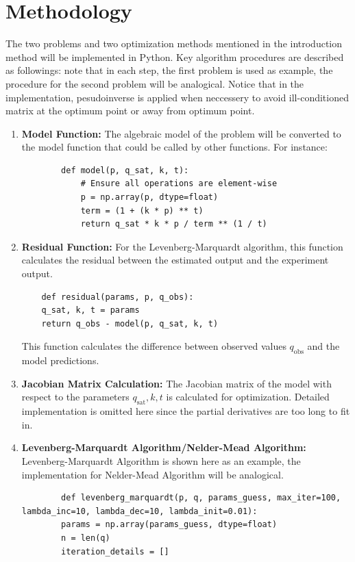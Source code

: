 \documentclass[12pt]{article} %
\begin{document}
\section{Methodology}
The two problems and two optimization methods mentioned in the introduction method will be implemented in Python. Key algorithm procedures are described as followings: note that in each step, the
first problem is used as example, the procedure for the second problem will be analogical. Notice that in the implementation, pesudoinverse is applied when neccessery to avoid ill-conditioned matrix at the optimum point or away from optimum point. 
\begin{enumerate}
    \item \textbf{Model Function:} The algebraic model of the problem will be converted to the model function that could be called by other functions. For instance:
    \begin{lstlisting}
        def model(p, q_sat, k, t):
            # Ensure all operations are element-wise
            p = np.array(p, dtype=float)
            term = (1 + (k * p) ** t)
            return q_sat * k * p / term ** (1 / t)
        \end{lstlisting}

    \item \textbf{Residual Function:} For the Levenberg-Marquardt algorithm, this function calculates the residual between the estimated output and the experiment output.
    \begin{lstlisting}
    def residual(params, p, q_obs):
    q_sat, k, t = params
    return q_obs - model(p, q_sat, k, t)
    \end{lstlisting}
    This function calculates the difference between observed values \( q_{\text{obs}} \) and the model predictions.

    \item \textbf{Jacobian Matrix Calculation:}
    The Jacobian matrix of the model with respect to the parameters \( q_{\text{sat}}, k, t \) is calculated for optimization. Detailed implementation is omitted here since the partial derivatives are too long to fit in.

    \item \textbf{Levenberg-Marquardt Algorithm/Nelder-Mead Algorithm:} Levenberg-Marquardt Algorithm is shown here as an example, the implementation for Nelder-Mead Algorithm will be analogical.
    
    \begin{lstlisting}
        def levenberg_marquardt(p, q, params_guess, max_iter=100, lambda_inc=10, lambda_dec=10, lambda_init=0.01):
        params = np.array(params_guess, dtype=float)
        n = len(q)
        iteration_details = []
    

\end{lstlisting}
\end{enumerate}
\end{document}
